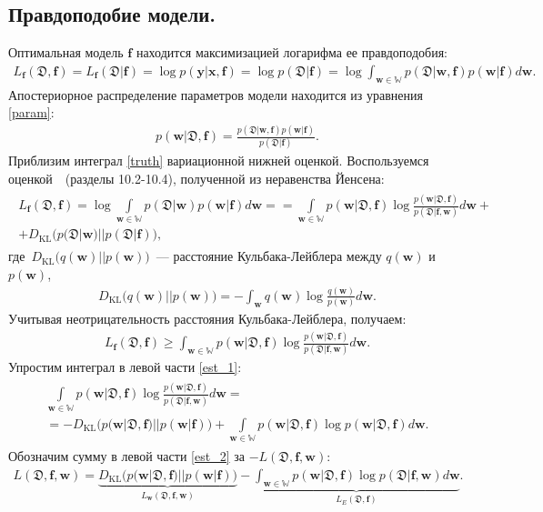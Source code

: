 \documentclass[12pt, fleqn, unicode]{article}
\newcommand{\PP}{p}
\newcommand{\DD}{{\mathfrak{D}}}
\newcommand{\WW}{{\mathbb{W}}}
\newcommand{\bw}{{\textbf{w}}}
\newcommand{\bx}{{\textbf{x}}}
\newcommand{\bbf}{{\textbf{f}}}
\newcommand{\by}{{\textbf{y}}}
\newcommand{\DKL}{\mathit{D}_{\text{KL}}}
\begin{document}
\subsection{Правдоподобие модели.}
Оптимальная модель $\bbf$ находится максимизацией логарифма ее правдоподобия:
\begin{gather}
	L_\bbf(\DD,\bbf) = L_\bbf(\DD|\bbf) = \log \PP(\by|\bx,\bbf) = \log \PP(\DD|\bbf) = \log \int_{\bw \in \WW}\PP(\DD|\bw,\bbf)\PP(\bw|\bbf)d\bw. \label{truth}
\end{gather}
Апостериорное распределение параметров модели находится из уравнения \eqref{param}:
\begin{gather}
	\PP(\bw|\DD,\bbf) = \frac{\PP(\DD|\bw,\bbf)\PP(\bw|\bbf)}{\PP(\DD|\bbf)}.
	\label{param}
\end{gather}
Приблизим интеграл \eqref{truth} вариационной нижней оценкой. Воспользуемся оценкой~\cite{Bishop}~(разделы 10.2-10.4), полученной из неравенства Йенсена:
\begin{gather}
\begin{split}
L_\bbf(\DD,\bbf) = \log\int\limits_{\bw \in \WW}\PP(\DD|\bw)\PP(\bw|\bbf)d\bw =
=\int\limits_{\bw \in \WW}\PP(\bw|\DD,\bbf)\log\frac{\PP(\bw|\DD,\bbf)}{\PP(\DD|\bbf,\bw)}d\bw +\\+ \DKL\bigl(\PP(\DD|\bw)||\PP(\DD|\bbf)\bigl),
\end{split}
\end{gather}
где~$\DKL\bigl(q(\bw)||p(\bw)\bigr)$~--- расстояние Кульбака-Лейблера между $q(\bw)$ и $p(\bw)$,
\begin{gather}
\displaystyle \DKL\bigl(q(\bw)||p(\bw)\bigr) = - \int_{\bw}q(\bw)\log\frac{q(\bw)}{p(\bw)}d\bw.
\end{gather}
Учитывая неотрицательность расстояния Кульбака-Лейблера, получаем:
\begin{gather}
	L_\bbf(\DD,\bbf) \geq \int_{\bw \in \WW}\PP(\bw|\DD,\bbf)\log\frac{\PP(\bw|\DD,\bbf)}{\PP(\DD|\bbf,\bw)}d\bw.
	\label{est_1}
\end{gather}
Упростим интеграл в левой части \eqref{est_1}:
\begin{gather}
	\begin{split}
		\int\limits_{\bw \in \WW}\PP(\bw|\DD,\bbf)\log\frac{\PP(\bw|\DD,\bbf)}{\PP(\DD|\bbf,\bw)}d\bw = \\
		= -\DKL\bigl(\PP(\bw|\DD,\bbf)||\PP(\bw|\bbf)\bigr) + \int\limits_{\bw \in \WW}\PP(\bw|\DD,\bbf)\log\PP(\bw|\DD,\bbf)d\bw.%
	\end{split}
	\label{est_2}%
\end{gather}
Обозначим сумму в левой части \eqref{est_2} за $-L(\DD,\bbf,\bw)$:
\begin{gather}
	L(\DD,\bbf,\bw) = \underbrace{\DKL\bigl(\PP(\bw|\DD,\bbf)||\PP(\bw|\bbf)\bigr)}_{L_\bw(\DD,\bbf,\bw)} - \underbrace{\int_{\bw \in \WW}\PP(\bw|\DD,\bbf)\log\PP(\DD|\bbf,\bw)d\bw}_{L_E(\DD,\bbf)}.
	\label{est_3}
\end{gather}
\end{document}
